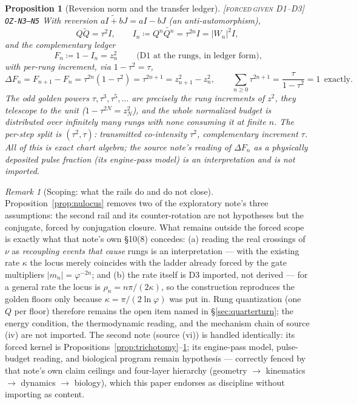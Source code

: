 \documentclass[11pt]{article}
\newcommand{\tagFD}{\textcolor{cF}{\textsc{[forced}}\,\textcolor{cD}{\textsc{given D1--D3]}}}
\newcommand{\hx}[1]{\textcolor{cC}{\footnotesize\texttt{#1}}}
\newcommand{\gp}{\varphi}
\theoremstyle{plain}
\newtheorem{proposition}[theorem]{Proposition}
\theoremstyle{definition}
\theoremstyle{remark}
\newtheorem{remark}[theorem]{Remark}
\begin{document}
\begin{proposition}[Reversion norm and the transfer ledger]\label{prop:ledger}\tagFD{} \hx{OZ-N3--N5}
With reversion $\widetilde{aI+bJ}=aI-bJ$ (an anti-automorphism),
\[
Q\widetilde Q=\tau^2 I,
\qquad
I_n \coloneqq Q^n\widetilde{Q^n}=\tau^{2n}I=|W_n|^2 I ,
\]
and the complementary ledger
\[
\boxed{\ F_n \coloneqq 1-I_n = z_n^2\ }
\qquad\text{(D1 at the rungs, in ledger form)},
\]
with per-rung increment, via $1-\tau^2=\tau$,
\[
\Delta F_n=F_{n+1}-F_n=\tau^{2n}(1-\tau^2)=\tau^{2n+1}
=z_{n+1}^2-z_n^2 ,
\qquad
\sum_{n\ge0}\tau^{2n+1}=\frac{\tau}{1-\tau^2}=1 \ \ \text{exactly}.
\]
The odd golden powers $\tau,\tau^3,\tau^5,\ldots$ are precisely the rung
increments of $z^2$, they telescope to the unit ($1-\tau^{2N}=z_N^2$), and the
whole normalized budget is distributed over infinitely many rungs with none
consuming it at finite $n$. The per-step split is $(\tau^2,\tau)$:
transmitted co-intensity $\tau^2$, complementary increment $\tau$. All of this
is exact chart algebra; the source note's reading of $\Delta F_n$ as a
physically \emph{deposited} pulse fraction (its engine-pass model) is an
interpretation and is not imported.
\end{proposition}

\begin{remark}[Scoping: what the rails do and do not close]\label{rem:railscope}
Proposition~\ref{prop:nulocus} removes two of the exploratory note's three
assumptions: the second rail and its counter-rotation are not hypotheses but
the conjugate, forced by conjugation closure. What remains outside the forced
scope is exactly what that note's own \S10(8) concedes: (a) reading the real
crossings of $\nu$ as \emph{recoupling events that cause} rungs is an
interpretation --- with the existing rate $\kappa$ the locus merely coincides
with the ladder already forced by the gate multipliers $|m_n|=\gp^{-2n}$; and
(b) the rate itself is D3 imported, not derived --- for a general rate the
locus is $\rho_n=n\pi/(2\kappa)$, so the construction reproduces the golden
floors only because $\kappa=\pi/(2\ln\gp)$ was put in. Rung quantization (one
$Q$ per floor) therefore remains the open item named in
\S\ref{sec:quarterturn}; the energy condition, the thermodynamic reading, and
the mechanism chain of source (iv) are not imported. The second note (source
(vi)) is handled identically: its forced kernel is
Propositions~\ref{prop:trichotomy}--\ref{prop:ledger}; its engine-pass model,
pulse-budget reading, and biological program remain hypothesis --- correctly
fenced by that note's own claim ceilings and four-layer hierarchy
(geometry $\to$ kinematics $\to$ dynamics $\to$ biology), which this paper
endorses as discipline without importing as content.
\end{remark}
\end{document}
